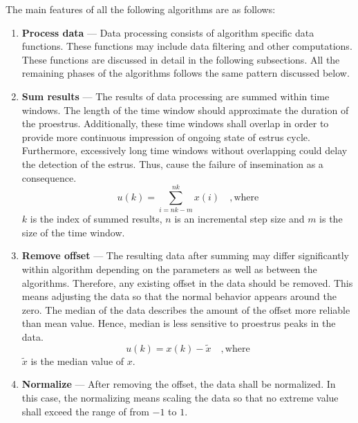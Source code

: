\documentclass[english,12pt,a4paper,pdftex,elec,utf8]{aaltothesis}
\begin{document}
The main features of all the following algorithms are as follows:
\begin{enumerate}

\item \textbf{Process data} --- Data processing consists of algorithm specific data functions. These functions may include data filtering and other computations. These functions are discussed in detail in the following subsections. All the remaining phases of the algorithms follows the same pattern discussed below. \\

\item \textbf{Sum results} --- The results of data processing are summed within time windows. The length of the time window should approximate the duration of the proestrus. Additionally, these time windows shall overlap in order to provide more continuous impression of ongoing state of estrus cycle. Furthermore, excessively long time windows without overlapping could delay the detection of the estrus. Thus, cause the failure of insemination as a consequence. \\

\begin{equation}
u(k) =\sum\limits^{nk}_{i = nk - m} x(i) \mathrm{\hspace{1em}, where}
\end{equation}
$k$ is the index of summed results, $n$ is an incremental step size and $m$ is the size of the time window.

\item \textbf{Remove offset} --- The resulting data after summing may differ significantly within algorithm depending on the parameters as well as between the algorithms. Therefore, any existing offset in the data should be removed. This means adjusting the data so that the normal behavior appears around the zero. The median of the data describes the amount of the offset more reliable than mean value. Hence, median is less sensitive to proestrus peaks in the data.  \\

\begin{equation}
u(k) = x(k) - \tilde{x} \mathrm{\hspace{1em}, where}
\end{equation}
$\tilde{x}$ is the median value of $x$.

\item \textbf{Normalize} --- After removing the offset, the data shall be normalized. In this case, the normalizing means scaling the data so that no extreme value shall exceed the range of from $-1$ to $1$.


\end{enumerate}
\end{document}
